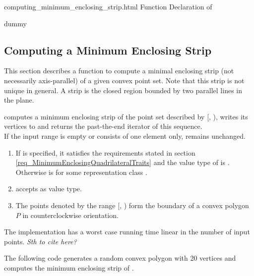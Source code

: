 \ccHtmlNoClassToc
\begin{ccHtmlClassFile}{computing_minimum_enclosing_strip.html}
  {Function Declaration of }
  \ccHtmlNoClassIndex\ccHtmlNoClassLinks
  \begin{ccClass}{dummy}
    \ccHtmlNoIndex\subsection{Computing a Minimum Enclosing Strip}
  \label{secMinimumEnclosingStrip}
  \end{ccClass}
  
  This section describes a function to compute a minimal enclosing
  strip (not necessarily axis-parallel) of a given convex point set.
  Note that this strip is not unique in general. A strip is the closed
  region bounded by two parallel lines in the plane.


  \def\ccLongParamLayout{\ccTrue} 
  
  
  computes a minimum enclosing strip of the point set described by
  [, ), writes its vertices to
   and returns the past-the-end iterator of this sequence.\\
  If the input range is empty or consists of one element only, 
  remains unchanged.
  
  \begin{enumerate}
  \item If  is specified, it satisfies the requirements
    stated in section \ref{req_MinimumEnclosingQuadrilateralTraits}
    and the value type  of  is
    . Otherwise  is
     for some representation class .
  \item {} accepts  as value type.
  \item The points denoted by the range [,
    ) form the boundary of a convex polygon $P$ in
    counterclockwise orientation.
  \end{enumerate}
  
  \ccImplementation The implementation has a worst case running time
  linear in the number of input points. \textit{Sth to cite here?}
  
  \ccExample The following code generates a random convex polygon
   with 20 vertices and computes the minimum enclosing
  strip of .


\end{ccHtmlClassFile}
    
